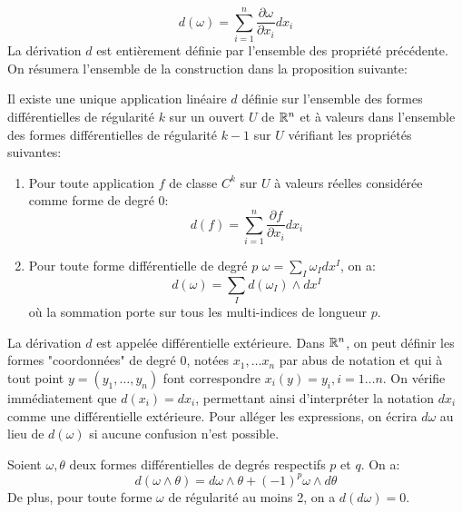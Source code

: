 \[
d\left(\omega\right) = \sum_{i=1}^n \frac{\partial \omega}{\partial x_i} dx_i
\]
La dérivation $d$ est entièrement définie par l'ensemble des propriété précédente. On résumera l'ensemble de la construction dans la proposition suivante:
\begin{fprop}
Il existe une unique application linéaire $d$ définie sur l'ensemble des formes différentielles de régularité $k$ sur un ouvert $U$ de $\mathbb{R}^n$ et à valeurs dans l'ensemble des formes différentielles de régularité $k-1$ sur $U$ vérifiant les propriétés suivantes:
\begin{enumerate}
\item Pour toute application $f$ de classe $C^k$ sur $U$ à valeurs réelles considérée comme forme de degré $0$:
\[
d\left(f\right) = \sum_{i=1}^n \frac{\partial f}{\partial x_i} dx_i
\]
\item Pour toute forme différentielle de degré $p$ $\omega = \sum_I \omega_I dx^I$, on a:
\[
d\left(\omega\right) = \sum_I d(\omega_I) \wedge dx^I
\] 
où la sommation porte sur tous les multi-indices de longueur $p$. 
\end{enumerate}
\end{fprop}
La dérivation $d$ est appelée différentielle extérieure.  Dans $\mathbb{R}^n$, on peut définir les formes "coordonnées" de degré 0, notées $x_1, \dots x_n$ par abus de notation et qui à tout point $y=(y_1,\dots,y_n)$ font correspondre $x_i(y) = y_i, i=1 \dots n$. On vérifie immédiatement que $d(x_i) = dx_i$, permettant ainsi d'interpréter la notation $dx_i$ comme une différentielle extérieure. 
Pour alléger les expressions, on écrira $d\omega$ au lieu de $d(\omega)$ si aucune confusion n'est possible.
\begin{fprop}
Soient $\omega, \theta$ deux formes différentielles de degrés respectifs $p$ et $q$. On a:
\[
d(\omega\wedge \theta) = d\omega \wedge \theta + (-1)^p \omega \wedge d \theta
\]
De plus, pour toute forme $\omega$ de régularité au moins 2, on a $d(d\omega) = 0$.
\end{fprop}
